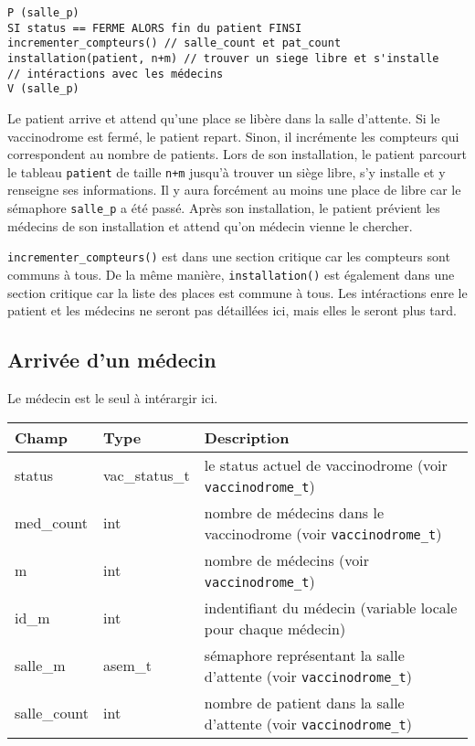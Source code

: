 \documentclass[a4paper]{article}
\begin{document}
\begin{verbatim}
P (salle_p)
SI status == FERME ALORS fin du patient FINSI
incrementer_compteurs() // salle_count et pat_count
installation(patient, n+m) // trouver un siege libre et s'installe
// intéractions avec les médecins
V (salle_p)
\end{verbatim}

    Le patient arrive et attend qu'une place se libère dans la salle d'attente. Si le vaccinodrome est fermé, le patient repart. Sinon, il incrémente les compteurs qui correspondent au nombre de patients.
    Lors de son installation, le patient parcourt le tableau \texttt{patient} de taille \texttt{n+m} jusqu'à trouver un siège libre, s'y installe et y renseigne ses informations. Il y aura forcément au moins une place de libre car le sémaphore \texttt{salle\_p} a été passé.
    Après son installation, le patient prévient les médecins de son installation et attend qu'on médecin vienne le chercher.
    
    \texttt{incrementer\_compteurs()} est dans une section critique car les compteurs sont communs à tous.
    De la même manière, \texttt{installation()} est également dans une section critique car la liste des places est commune à tous.
    Les intéractions enre le patient et les médecins ne seront pas détaillées ici, mais elles le seront plus tard.
  
\subsection{Arrivée d'un médecin}

Le médecin est le seul à intérargir ici.
\bigskip \newline
\begin{tabularx}{\linewidth}{|l|l|>{\strut}X|}
  \hline%
  Champ & Type & Description \\ \hline%
  status & vac\_status\_t & le status actuel de vaccinodrome (voir \texttt{vaccinodrome\_t}) \\ \hline%
  med\_count & int & nombre de médecins dans le vaccinodrome (voir \texttt{vaccinodrome\_t}) \\ \hline%
  m & int & nombre de médecins (voir \texttt{vaccinodrome\_t}) \\ \hline%
  id\_m & int & indentifiant du médecin (variable locale pour chaque médecin) \\ \hline%
  salle\_m & asem\_t & sémaphore représentant la salle d'attente (voir \texttt{vaccinodrome\_t}) \\ \hline%
  salle\_count & int & nombre de patient dans la salle d'attente (voir \texttt{vaccinodrome\_t}) \\ \hline%
\end{tabularx}
  
\end{document}
